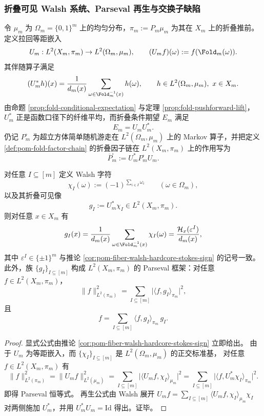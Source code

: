 \subsubsection{折叠可见 Walsh 系统、Parseval 再生与交换子缺陷}\label{subsubsec:pom-visible-walsh-factor-chain-commutator}

令 \(\mu_m\) 为 \(\Omega_m=\{0,1\}^m\) 上的均匀分布，\(\pi_m:=P_m\mu_m\) 为其在 \(X_m\) 上的折叠推前。
定义拉回等距嵌入
\[
U_m:L^2(X_m,\pi_m)\to L^2(\Omega_m,\mu_m),
\qquad
(U_m f)(\omega):=f(\Fold_m(\omega)).
\]
其伴随算子满足
\[
(U_m^\ast h)(x)=\frac{1}{d_m(x)}\sum_{\omega\in\Fold_m^{-1}(x)}h(\omega),
\qquad h\in L^2(\Omega_m,\mu_m),\ x\in X_m.
\]
由命题 \ref{prop:fold-conditional-expectation} 与定理 \ref{prop:fold-pushforward-lift}，
\(U_m^\ast\) 正是函数口径下的纤维平均，而折叠条件期望 \(E_m\) 满足
\[
E_m=U_mU_m^\ast.
\]
仍记 \(P_m^\square\) 为超立方体简单随机游走在 \(L^2(\Omega_m,\mu_m)\) 上的 Markov 算子，并把定义 \ref{def:pom-fold-factor-chain} 的折叠因子链在 \(L^2(X_m,\pi_m)\) 上的作用写为
\[
\overline P_m^\square:=U_m^\ast P_m^\square U_m.
\]

\begin{theorem}\label{thm:pom-visible-walsh-parseval-frame}
对任意 \(I\subseteq[m]\) 定义 Walsh 字符
\[
\chi_I(\omega):=(-1)^{\sum_{i\in I}\omega_i}\qquad(\omega\in\Omega_m),
\]
以及其折叠可见像
\[
g_I:=U_m^\ast\chi_I\in L^2(X_m,\pi_m).
\]
则对任意 \(x\in X_m\) 有
\[
g_I(x)=\frac{1}{d_m(x)}\sum_{\omega\in\Fold_m^{-1}(x)}\chi_I(\omega)
=\frac{\mathcal H_x(\varepsilon^I)}{d_m(x)},
\]
其中 \(\varepsilon^I\in\{\pm1\}^m\) 与推论 \ref{cor:pom-fiber-walsh-hardcore-stokes-sign} 的记号一致。
此外，族 \(\{g_I\}_{I\subseteq[m]}\) 构成 \(L^2(X_m,\pi_m)\) 的 Parseval 框架：对任意 \(f\in L^2(X_m,\pi_m)\)，
\[
\|f\|_{L^2(\pi_m)}^2
=\sum_{I\subseteq[m]}\bigl|\langle f,g_I\rangle_{\pi_m}\bigr|^2,
\]
且
\[
f=\sum_{I\subseteq[m]}\langle f,g_I\rangle_{\pi_m}\,g_I.
\]
\end{theorem}
\begin{proof}
显式公式由推论 \ref{cor:pom-fiber-walsh-hardcore-stokes-sign} 立即给出。
由于 \(U_m\) 为等距嵌入，而 \(\{\chi_I\}_{I\subseteq[m]}\) 是 \(L^2(\Omega_m,\mu_m)\) 的正交标准基，
对任意 \(f\in L^2(X_m,\pi_m)\) 有
\[
\|f\|_{L^2(\pi_m)}^2
=\|U_m f\|_{L^2(\mu_m)}^2
=\sum_{I\subseteq[m]}\bigl|\langle U_m f,\chi_I\rangle_{\mu_m}\bigr|^2
=\sum_{I\subseteq[m]}\bigl|\langle f,U_m^\ast\chi_I\rangle_{\pi_m}\bigr|^2.
\]
即得 Parseval 恒等式。
再生公式由 Walsh 展开
\(
U_m f=\sum_{I\subseteq[m]}\langle U_m f,\chi_I\rangle_{\mu_m}\chi_I
\)
对两侧施加 \(U_m^\ast\)，并用 \(U_m^\ast U_m=\mathrm{Id}\) 得出。证毕。
\end{proof}


